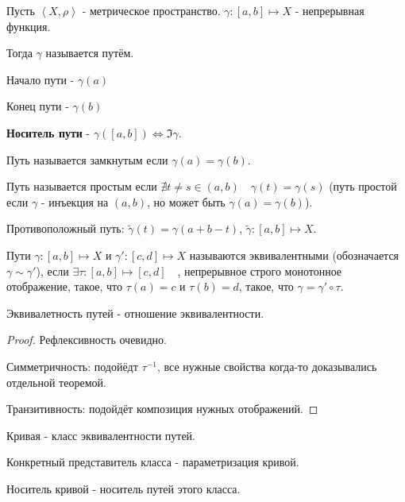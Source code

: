 
\begin{definition} \thmslashn 

    Пусть $\left<X, \rho\right>$ - метрическое пространство. $\gamma : [a, b] \mapsto X$ - непрерывная функция.

    Тогда $\gamma$ называется путём.

    Начало пути - $\gamma(a)$

    Конец пути - $\gamma(b)$

    \textbf{Носитель пути} - $\gamma([a, b]) \iff \Im \gamma$.

    Путь называется замкнутым если $\gamma(a) = \gamma(b)$.

    Путь называется простым если $\nexists{t \neq s\in (a, b)}\quad \gamma(t) = \gamma(s)$ (путь простой если $\gamma$ - инъекция на $(a, b)$, но может быть $\gamma(a) = \gamma(b)$).

    Противоположный путь: $\tilde{\gamma}(t) = \gamma(a + b - t)$, $\tilde{\gamma} : [a, b] \mapsto X$.

    Пути $\gamma : [a, b] \mapsto X$ и $\gamma' : [c, d] \mapsto X$ называются эквивалентными (обозначается $\gamma \sim \gamma'$), если $\exists{\tau : [a, b] \mapsto [c, d]}\quad$, непрерывное строго монотонное отображение, такое, что $\tau(a) = c$ и $\tau(b) = d$, такое, что $\gamma = \gamma' \circ \tau$. 
\end{definition}
\begin{remark} \thmslashn

    Эквивалетность путей - отношение эквивалентности.

    \begin{proof} \thmslashn
    
        Рефлексивность очевидно.

        Симметричность: подойёдт $\tau^{-1}$, все нужные свойства когда-то доказывались отдельной теоремой.

        Транзитивность: подойдёт композиция нужных отображений.
    \end{proof}
\end{remark}

\begin{definition} \thmslashn 

    Кривая - класс эквивалентности путей.

    Конкретный представитель класса - параметризация кривой.

    Носитель кривой - носитель путей этого класса.
\end{definition}
